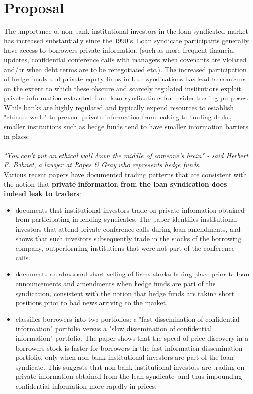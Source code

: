 \documentclass[english, 1p]{elsarticle}
\begin{document}
 

\section{Proposal} 


The importance of non-bank institutional investors in the loan syndicated market has increased substantially since the 1990's. Loan syndicate participants generally have access to borrowers private information (such as more frequent financial updates, confidential conference calls with managers when covenants are violated and/or when debt terms are to be renegotiated etc.).  
The increased participation of hedge funds and private equity firms in loan syndications has lead to concerns on the extent to which these obscure and scarcely regulated institutions exploit private information extracted from loan syndications for insider trading purposes. While banks are highly regulated and typically expend resources to establish "chinese walls" to prevent private information from leaking to trading desks, smaller institutions such as hedge funds tend to have smaller information barriers in place: \\
\\
\textit{"You can't put an ethical wall down the middle of someone's brain" - said Herbert F. Bohnet, a lawyer at Ropes \& Gray who represents hedge funds}. \citep[\textit{The New York Times}]{NYTOct2006}. \\

  Various recent papers have documented trading patterns that are consistent with the notion that \textbf{private information from the loan syndication does indeed leak to traders}:
  \begin{itemize}
   \item \cite{Ivashina2011a} documents that institutional investors trade on private information obtained from participating in lending syndicates. The paper identifies institutional investors that attend private conference calls during loan amendments, and shows that such investors subsequently trade in the stocks of the borrowing company, outperforming institutions that were not part of the conference calls. 
   \item \cite{Massoud2011} documents an abnormal short selling of firms stocks taking place prior to loan announcements and amendments when hedge funds are part of the syndication, consistent with the notion that hedge funds are taking short positions prior to bad news arriving to the market. 
   \item \cite{Bushman2010} classifies borrowers into two portfolios: a "fast dissemination of confidential information" portfolio versus a "slow dissemination of confidential information" portfolio. The paper shows that the speed of price discovery in a borrowers stock is faster for borrowers in the fast information dissemination portfolio, only when non-bank institutional investors are part of the loan syndicate. This suggests that non bank institutional investors are trading on private information obtained from the loan syndicate, and thus impounding confidential information more rapidly in prices.  
 
 \end{itemize}
\end{document}
